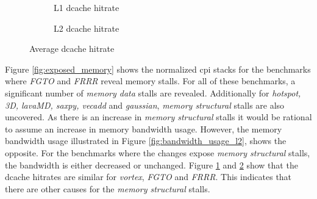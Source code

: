 \begin{figure}
    \centering
    \begin{subfigure}{\textwidth}
         \centering
         \caption{L1 dcache hitrate}
         \label{fig:l1_dcache_hitrate}
     \end{subfigure}
     \hfill
         \begin{subfigure}{\textwidth}
         \centering
         \caption{L2 dcache hitrate}
         \label{fig:l2_dcache_hitrate}
    \end{subfigure}
    \caption{Average dcache hitrate}
    \label{fig:dcache_hitrate}
\end{figure}

Figure \ref{fig:exposed_memory} shows the normalized \acrshort{cpi} stacks for the benchmarks where \textit{FGTO} and \textit{FRRR} reveal memory stalls. For all of these benchmarks, a significant number of \textit{memory data} stalls are revealed. Additionally for \textit{hotspot, 3D, lavaMD, saxpy, vecadd} and \textit{gaussian}, \textit{memory structural} stalls are also uncovered. As there is an increase in \textit{memory structural} stalls it would be rational to assume an increase in memory bandwidth usage. However, the memory bandwidth usage illustrated in Figure \ref{fig:bandwidth_usage_l2}, shows the opposite. For the benchmarks where the changes expose \textit{memory structural} stalls, the bandwidth is either decreased or unchanged. Figure \ref{fig:l1_dcache_hitrate} and \ref{fig:l2_dcache_hitrate} show that the dcache hitrates are similar for \textit{\Gls{vortex}}, \textit{FGTO} and \textit{FRRR}. This indicates that there are other causes for the \textit{memory structural} stalls.

